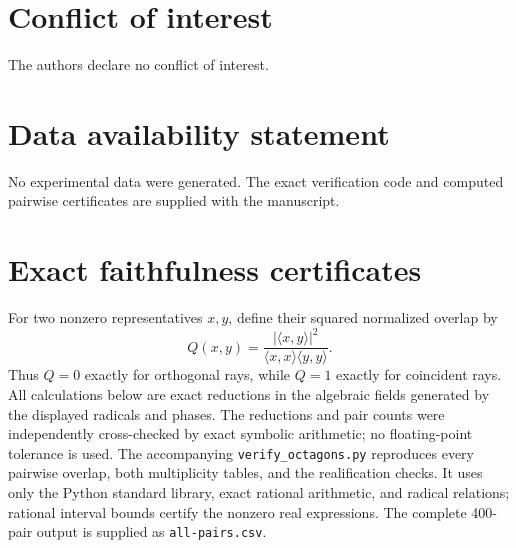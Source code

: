 \documentclass[12pt,a4paper]{article}
\theoremstyle{definition}
\theoremstyle{remark}
\begin{document}
\section*{Conflict of interest}
The authors declare no conflict of interest.

\section*{Data availability statement}
No experimental data were generated.  The exact verification code and
computed pairwise certificates are supplied with the manuscript.

\appendix
\setcounter{equation}{0}
\renewcommand{\theequation}{A\arabic{equation}}
\renewcommand{\theHequation}{appendix.A\arabic{equation}}

\section{Exact faithfulness certificates}
\label{app:faithfulness}

For two nonzero representatives $x,y$, define their squared normalized
overlap by
\begin{equation}
 Q(x,y)=\frac{|\langle x,y\rangle|^2}
 {\langle x,x\rangle\langle y,y\rangle}.
 \label{eq:Q}
\end{equation}
Thus $Q=0$ exactly for orthogonal rays, while $Q=1$ exactly for
coincident rays.  All calculations below are exact reductions in the
algebraic fields generated by the displayed radicals and phases.  The
reductions and pair counts were independently cross-checked by exact symbolic
arithmetic; no floating-point tolerance is used.
The accompanying \texttt{verify\_octagons.py} reproduces every pairwise
overlap, both multiplicity tables, and the realification checks.  It uses
only the Python standard library, exact rational arithmetic, and radical
relations; rational interval bounds certify the nonzero real expressions.
The complete 400-pair output is supplied as \texttt{all-pairs.csv}.
\end{document}

